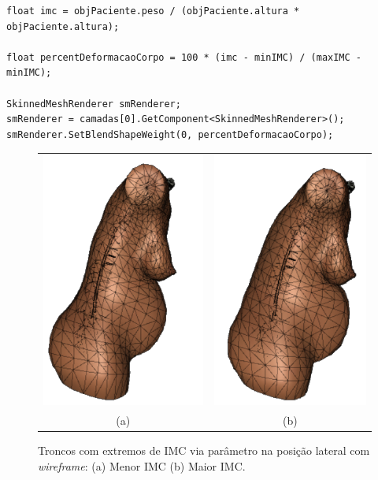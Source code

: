 \begin{lstlisting}[label=lst:codigo_alteracao_forma_paciente, caption={Exemplo de alteração do corpo do paciente via script em C\#.}, language=sharpc]
float imc = objPaciente.peso / (objPaciente.altura * objPaciente.altura);

float percentDeformacaoCorpo = 100 * (imc - minIMC) / (maxIMC - minIMC);
        
SkinnedMeshRenderer smRenderer;
smRenderer = camadas[0].GetComponent<SkinnedMeshRenderer>();
smRenderer.SetBlendShapeWeight(0, percentDeformacaoCorpo);
\end{lstlisting}

\begin{figure}[ht!]
    \centering
        \begin{tabular}{cc}
        \includegraphics[width=0.4\linewidth]{capitulos/figuras/Corpo-menor-IMC-Wireframe.png} & 
        \includegraphics[width=0.38\linewidth]{capitulos/figuras/Corpo-maior-IMC-Wireframe.png} 
        \\
        (a) & (b)
        \end{tabular}
    \caption{Troncos com extremos de \acrshort{IMC} via parâmetro na posição lateral com \textit{wireframe}: (a) Menor \acrshort{IMC} (b) Maior \acrshort{IMC}.}
    \label{fig:extremosCorpoIMC}
\end{figure}

